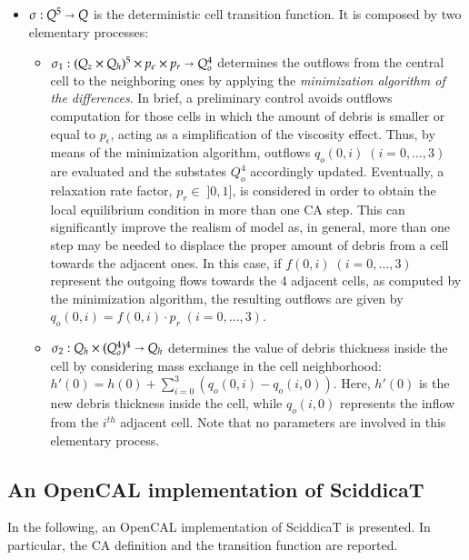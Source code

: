 \begin{itemize}
\item $\sigma : Q^5 \shortrightarrow Q$ is the deterministic cell
  transition function. It is composed by two elementary processes:
\begin{itemize}
\item $\sigma_1 : (Q_z \times Q_h)^5 \times p_\epsilon \times
  p_r\shortrightarrow Q_o^4$ determines the outflows from the central
  cell to the neighboring ones by applying the \emph{minimization
    algorithm of the differences}. In brief, a preliminary control
  avoids outflows computation for those cells in which the amount of
  debris is smaller or equal to $p_\epsilon$, acting as a
  simplification of the viscosity effect. Thus, by means of the
  minimization algorithm, outflows $q_o(0,i) \; (i=0,\ldots,3)$ are
  evaluated and the substates $Q_o^4$ accordingly updated.
  Eventually, a relaxation rate factor, $p_r \in \; ]0,1]$, is
      considered in order to obtain the local equilibrium condition in
      more than one CA step. This can significantly improve the
      realism of model as, in general, more than one step may be
      needed to displace the proper amount of debris from a cell
      towards the adjacent ones. In this case, if $f(0,i) \; (i=0,
      \ldots, 3)$ represent the outgoing flows towards the 4 adjacent
      cells, as computed by the minimization algorithm, the resulting
      outflows are given by $q_o(0,i)=f(0,i) \cdot p_r \; (i=0,
      \ldots, 3)$.


\item $\sigma_2: Q_h \times (Q_o^4)^4 \shortrightarrow Q_h$ determines
  the value of debris thickness inside the cell by considering mass
  exchange in the cell neighborhood: $h'(0) = h(0) + \sum_{i=0}^3
  (q_o(0,i) - q_o(i,0))$. Here, $h'(0)$ is the new debris
  thickness inside the cell, while $q_o(i,0)$ represents the inflow from
  the $i^{th}$ adjacent cell. Note that no parameters are involved in
  this elementary process.

\end{itemize}
\end{itemize}

\subsection{An OpenCAL implementation of SciddicaT}
In the following, an OpenCAL implementation of SciddicaT is
presented. In particular, the CA definition and the transition
function are reported.

